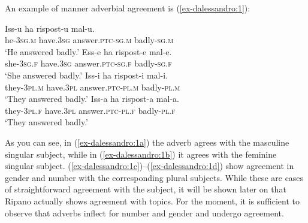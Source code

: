 \documentclass[output=paper
,modfonts
,nonflat]{langsci/langscibook}
\begin{document}
An example of manner adverbial agreement is (\ref{ex-dalessandro:1}):

\begin{exe}
\ex\label{ex-dalessandro:1} \citet[8]{Burroni_Et_Al2016} \xlist
	\ex \label{ex-dalessandro:1a}
	\gll Iss-u    ha    rispost-u     mal-u.\\
	he-3\textsc{sg.m}  have.\textsc{3sg}  answer.\textsc{ptc-sg.m}  badly-\textsc{sg.m}\\
	\glt `He answered badly.' 
	\ex\label{ex-dalessandro:1b}
	\gll Ess-e    ha    rispost-e     mal-e.\\
	she-\textsc{3sg.f}  have.\textsc{3sg}  answer\textsc{.ptc-sg.f}  badly-\textsc{sg.f}\\
	\glt `She answered badly.' 
	\ex\label{ex-dalessandro:1c}
	\gll Iss-i    ha     rispost-i    mal-i.\\
	they-\textsc{3pl.m} have.\textsc{3pl} answer.\textsc{ptc-pl.m}  badly-\textsc{pl.m}\\
	\glt `They answered badly.' 
	\ex\label{ex-dalessandro:1d}
	\gll Iss-a    ha    rispost-a    mal-a.\\
	they-\textsc{3pl.f} have.\textsc{3pl} answer.\textsc{ptc-pl.f}  badly-\textsc{pl.f}\\
	\glt `They answered badly.' 
\endxlist
\end{exe}
As you can see, in (\ref{ex-dalessandro:1a}) the adverb agrees with the masculine singular subject, while in (\ref{ex-dalessandro:1b}) it agrees with the feminine singular subject. (\ref{ex-dalessandro:1c})--(\ref{ex-dalessandro:1d}) show agreement in gender and number with the corresponding plural subjects. While these are cases of straightforward agreement with the subject, it will be shown later on that Ripano actually shows agreement with topics. For the moment, it is sufficient to observe that adverbs inflect for number and gender and undergo agreement.
\end{document}
